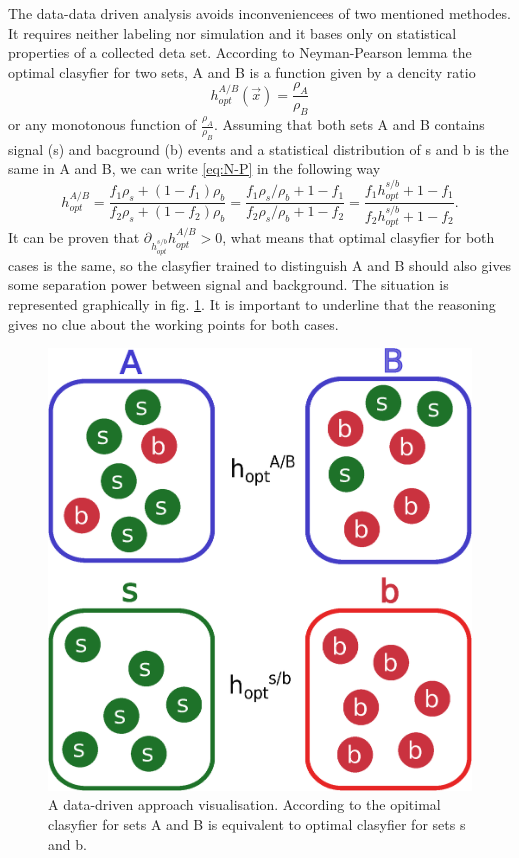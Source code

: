 The data-data driven analysis avoids inconveniencees of two mentioned methodes. It requires neither labeling nor simulation and it bases only on statistical properties of a collected deta set. According to Neyman-Pearson lemma \cite{Neyman-Pearson} the optimal clasyfier for two sets, A and B is a function given by a dencity ratio
\begin{equation}
  \label{eq:N-P}
  h_{opt}^{A/B}(\vec x)=\frac{\rho_A}{\rho_B}
\end{equation}
or any monotonous function of $\frac{\rho_A}{\rho_B}$. Assuming that both sets A and B contains signal (s) and bacground (b) events and a statistical distribution of s and b is the same in A and B, we can write \eqref{eq:N-P} in the following way
\begin{equation}
  h^{A/B}_{opt}=\frac{f_1 \rho_s + (1-f_1) \rho_b}{f_2 \rho_s + (1-f_2) \rho_b}=\frac{f_1 \rho_s/\rho_b+1-f_1}{f_2 \rho_s/\rho_b+1-f_2}=\frac{f_1 h_{opt}^{s/b}+1-f_1}{f_2 h_{opt}^{s/b} +1-f_2}.
\end{equation}
It can be proven that $\partial_{h_{opt}^{s/b}}h_{opt}^{A/B} >0$, what means that optimal clasyfier for both cases is the same, so the clasyfier trained to distinguish A and B should also gives some separation power between signal and background. The situation is represented graphically in fig. \ref{fig:DD}.  It is important to underline that the reasoning gives no clue about the working points for both cases. 

\begin{figure}[h]
  \centering
  \includegraphics[width=0.5 \textwidth]{Chapter_NN/setAB.eps}
\caption{A data-driven approach visualisation. According to \cite{Metodiev_2017} the opitimal clasyfier for sets A and B is equivalent to optimal clasyfier for sets s and b.}
\label{fig:DD}
\end{figure}



